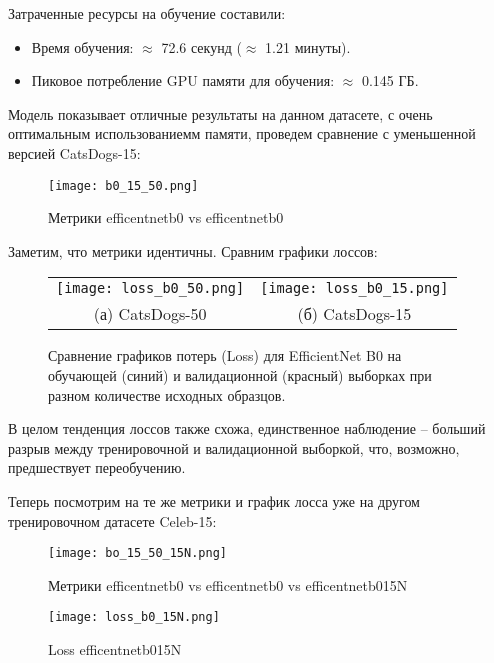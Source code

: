 \documentclass[14pt]{extarticle}
\begin{document}
Затраченные ресурсы на обучение составили:
\begin{itemize}[leftmargin=*, itemsep=0pt]
    \item Время обучения: $\approx$ 72.6 секунд ($\approx$ 1.21 минуты).
    \item Пиковое потребление GPU памяти для обучения: $\approx$ 0.145 ГБ. 
\end{itemize}

Модель показывает отличные результаты на данном датасете, с очень оптимальным использованиемм памяти, проведем сравнение с уменьшенной версией CatsDogs-15:
\begin{figure}[H]
    \centering
    \texttt{[image: b0\_15\_50.png]}
    \caption{Метрики efficentnet\textunderscore b0 vs efficentnet\textunderscore b0}
    \label{fig:имя_метки}
\end{figure}


Заметим, что метрики идентичны. Сравним графики лоссов:

\begin{figure}[htbp] 
    \centering 
    \begin{tabular}{cc} 
        \texttt{[image: loss\_b0\_50.png]} & 
        \texttt{[image: loss\_b0\_15.png]} \\
        (а) CatsDogs-50 & 
        (б) CatsDogs-15
    \end{tabular}

    \caption{Сравнение графиков потерь (Loss) для EfficientNet B0 на обучающей (синий) и валидационной (красный) выборках при разном количестве исходных образцов.}
    \label{fig:loss_b0_comparison} 
\end{figure}

В целом тенденция лоссов также схожа, единственное наблюдение -- больший разрыв между тренировочной и валидационной выборкой, что, возможно, предшествует переобучению.

Теперь посмотрим на те же метрики и график лосса уже на другом тренировочном датасете Celeb-15:
\begin{figure}[H]
    \centering
    \texttt{[image: bo\_15\_50\_15N.png]}
    \caption{Метрики efficentnet\textunderscore b0 vs efficentnet\textunderscore b0 vs efficentnet\textunderscore b0\textunderscore 15N}
    \label{fig:имя_метки}
\end{figure}

\begin{figure}[H]
    \centering
    \texttt{[image: loss\_b0\_15N.png]}
    \caption{Loss efficentnet\textunderscore b0\textunderscore 15N}
    \label{fig:имя_метки}
\end{figure}
\end{document}
